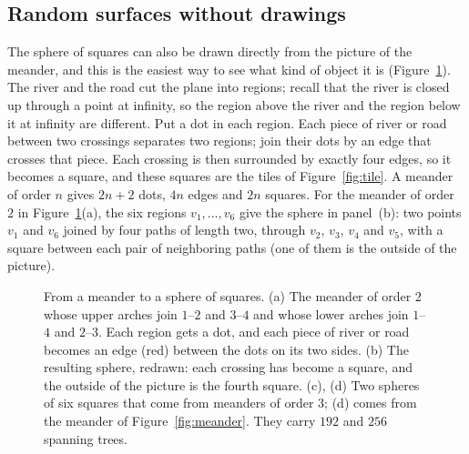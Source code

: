 \subsection{Random surfaces without drawings}

The sphere of squares can also be drawn directly from the picture of the meander, and this is
the easiest way to see what kind of object it is (Figure~\ref{fig:spheres}). The river and the
road cut the plane into regions; recall that the river is closed up through a point at infinity,
so the region above the river and the region below it at infinity are different. Put a dot in each
region. Each piece of river or road between two crossings separates two regions; join their dots
by an edge that crosses that piece. Each crossing is then surrounded by exactly four edges, so it
becomes a square, and these squares are the tiles of Figure~\ref{fig:tile}. A meander of order $n$
gives $2n+2$ dots, $4n$ edges and $2n$ squares. For the meander of order~$2$ in
Figure~\ref{fig:spheres}(a), the six regions $v_1,\ldots,v_6$ give the sphere in panel~(b): two
points $v_1$ and $v_6$ joined by four paths of length two, through $v_2$, $v_3$, $v_4$ and $v_5$,
with a square between each pair of neighboring paths (one of them is the outside of the
picture).

\begin{figure}[t]
\centering

\caption{From a meander to a sphere of squares. (a) The meander of order $2$ whose upper arches
join $1$--$2$ and $3$--$4$ and whose lower arches join $1$--$4$ and $2$--$3$. Each region gets a
dot, and each piece of river or road becomes an edge (red) between the dots on its two sides.
(b) The resulting sphere, redrawn: each crossing has become a square, and the outside of the
picture is the fourth square. (c), (d) Two spheres of six squares that come from meanders of
order $3$; (d) comes from the meander of Figure~\ref{fig:meander}. They carry $192$ and $256$
spanning trees.}
\label{fig:spheres}
\end{figure}

